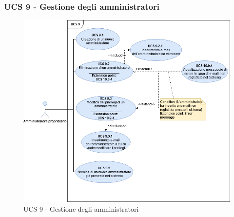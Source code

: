 \subsubsection{UCS 9 - Gestione degli amministratori}%

\begin{figure}[h!]
    \centering
      \includegraphics[scale=0.5]{Sezioni/UseCase/Immagini/UCS9.png}
    \caption{UCS 9 - Gestione degli amministratori}
  \end{figure}
